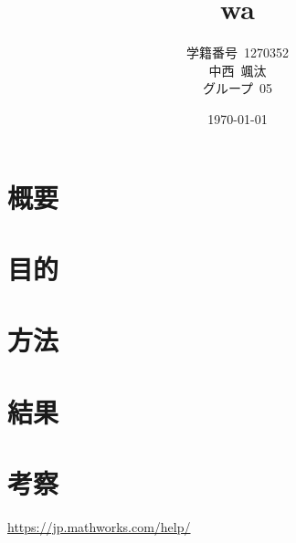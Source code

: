 \documentclass{jlreq}
\title{wa}
\author{学籍番号~1270352\\
        中西~颯汰\\
        グループ~05\\
        }
\date{\today}
\begin{document}
\maketitle
\clearpage
\tableofcontents
\clearpage
\section{概要}
\section{目的}
\section{方法}
\section{結果}
\section{考察}
\begin{thebibliography}{9}

\url{https://jp.mathworks.com/help/}
\end{thebibliography}
\end{document}
